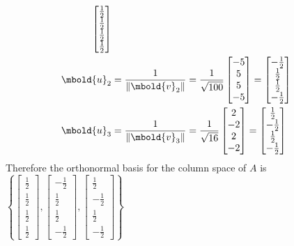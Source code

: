 \documentclass[12pt letter]{report}
\begin{document}
{\begin{align*}
    \begin{bmatrix} \frac{1}{2} \\ \frac{1}{2} \\ \frac{1}{2} \\ \frac{1}{2} \end{bmatrix}                            \\
    \mbold{u}_2 & = \frac{1}{\|\mbold{v}_2\|} = \frac{1}{\sqrt{100}} \begin{bmatrix} -5 \\ 5\\ 5\\ -5 \end{bmatrix} =
    \begin{bmatrix} -\frac{1}{2} \\ \frac{1}{2} \\ \frac{1}{2} \\ -\frac{1}{2} \end{bmatrix}                          \\
    \mbold{u}_3 & = \frac{1}{\|\mbold{v}_3\|} = \frac{1}{\sqrt{16}} \begin{bmatrix} 2 \\ -2\\ 2\\ -2 \end{bmatrix} =
    \begin{bmatrix} \frac{1}{2} \\ -\frac{1}{2} \\ \frac{1}{2} \\ -\frac{1}{2} \end{bmatrix}                          \\
  \end{align*}
  Therefore the orthonormal basis for the column space of $A$ is $\left\{ \begin{bmatrix} \frac{1}{2} \\ \frac{1}{2}\\
      \frac{1}{2} \\ \frac{1}{2}\end{bmatrix}, \begin{bmatrix} -\frac{1}{2} \\ \frac{1}{2}\\ \frac{1}{2}\\ -\frac{1}{2}
    \end{bmatrix}, \begin{bmatrix} \frac{1}{2} \\ -\frac{1}{2}\\ \frac{1}{2}\\ -\frac{1}{2} \end{bmatrix} \right\} $
}
\end{document}
